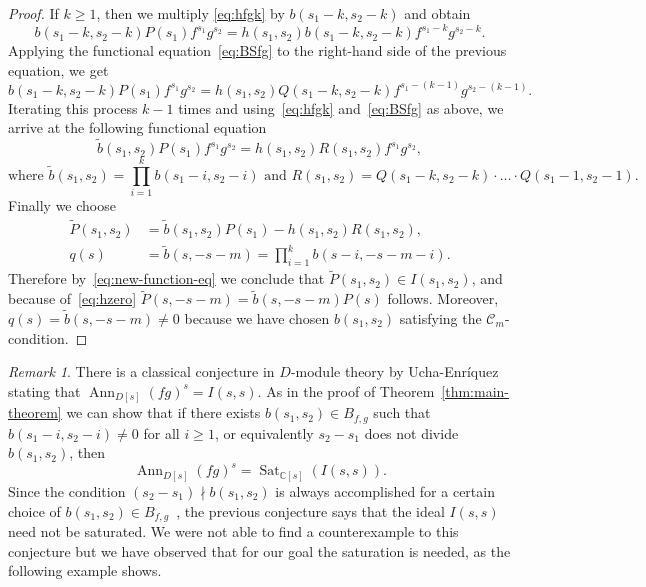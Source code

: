 \documentclass[a4paper,12pt]{amsart}
\theoremstyle{plain}
\theoremstyle{definition}
\theoremstyle{remark}
\newtheorem{remark}[theorem]{Remark}
\def\CC{\mathbb{C}}
\DeclareMathOperator{\Ann}{Ann}
\DeclareMathOperator{\Sat}{Sat}
\begin{document}
\begin{proof}
If $k\geq 1$, then we multiply \eqref{eq:hfgk} by $b(s_1-k,s_2-k)$ and obtain
\[
b(s_1-k,s_2-k) P(s_1) f^{s_1} g^{s_2} = h(s_1,s_2) b(s_1-k,s_2-k) f^{s_1-k} g^{s_2-k}.
\]
Applying the functional equation~\eqref{eq:BSfg} to the right-hand side of the previous equation, we get
\[
b(s_1-k,s_2-k) P(s_1) f^{s_1} g^{s_2} = h(s_1,s_2) Q(s_1-k,s_2-k) f^{s_1-(k-1)} g^{s_2-(k-1)}.
\]
Iterating this process $k-1$ times and using~\eqref{eq:hfgk} and~\eqref{eq:BSfg} as above, we arrive at the following functional equation
\begin{equation}\label{eq:new-function-eq}
\tilde{b}(s_1,s_2) P(s_1) f^{s_1} g^{s_2} = h(s_1,s_2) R(s_1,s_2) f^{s_1} g^{s_2},
\end{equation}
\[
\mbox{where }
\tilde{b}(s_1,s_2) = \prod_{i=1}^k b(s_1-i, s_2-i) \mbox{ and } R(s_1,s_2) = Q(s_1-k,s_2-k) \cdot \ldots \cdot Q(s_1-1,s_2-1).
\]
Finally we choose
\[
\begin{aligned}
\tilde{P}(s_1,s_2) &= \tilde{b}(s_1,s_2) P(s_1) - h(s_1,s_2) R(s_1,s_2), \\
q(s) &= \tilde{b}(s,-s-m) = \prod_{i=1}^k b(s-i, -s-m-i).
\end{aligned}
\]
Therefore by~\eqref{eq:new-function-eq} we conclude that $\tilde{P}(s_1,s_2) \in I(s_1,s_2)$,
and because of~\eqref{eq:hzero} $\tilde{P}(s,-s-m) = \tilde{b}(s,-s-m) P(s)$ follows.
Moreover, $q(s) = \tilde{b}(s,-s-m) \neq 0$ because we have chosen $b(s_1,s_2)$ satisfying the $\mathcal{C}_m$-condition.
\end{proof}

\begin{remark}
There is a classical conjecture in $D$-module theory by Ucha-Enríquez \cite[Section 4.4.1]{And14} stating that $\Ann_{D[s]}(fg)^s = I(s,s)$. As in the proof of
Theorem~\ref{thm:main-theorem} we can show that if there exists $b(s_1,s_2) \in B_{f,g}$ such that $b(s_1-i,s_2-i) \neq 0$
for all $i \geq 1$, or equivalently $s_2-s_1$ does not divide $b(s_1,s_2)$, then
\[
\Ann_{D[s]}(fg)^s = \Sat_{\CC[s]}(I(s,s)).
\]
Since the condition $(s_2-s_1) \nmid b(s_1,s_2)$ is always accomplished for a certain choice of
$b(s_1,s_2) \in B_{f,g}$~\cite{Sab87I, Gyo93},
the previous conjecture says that the ideal $I(s,s)$ need not be saturated. We were not able to find a counterexample to this
conjecture but we have observed that for our goal the saturation is needed, as the following example shows.
\end{remark}
\end{document}
